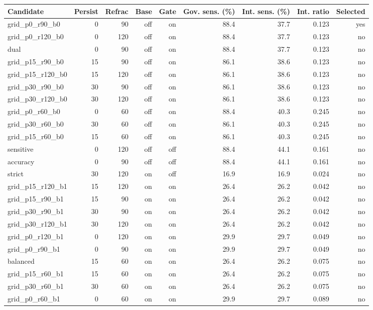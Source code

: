 \begin{tabular}{@{}lrrrrrrrr@{}}
\toprule
Candidate & Persist & Refrac & Base & Gate & Gov. sens. (\%) & Int. sens. (\%) & Int. ratio & Selected \\
\midrule
grid\_p0\_r90\_b0 & 0 & 90 & off & on & 88.4 & 37.7 & 0.123 & yes \\
grid\_p0\_r120\_b0 & 0 & 120 & off & on & 88.4 & 37.7 & 0.123 & no \\
dual & 0 & 90 & off & on & 88.4 & 37.7 & 0.123 & no \\
grid\_p15\_r90\_b0 & 15 & 90 & off & on & 86.1 & 38.6 & 0.123 & no \\
grid\_p15\_r120\_b0 & 15 & 120 & off & on & 86.1 & 38.6 & 0.123 & no \\
grid\_p30\_r90\_b0 & 30 & 90 & off & on & 86.1 & 38.6 & 0.123 & no \\
grid\_p30\_r120\_b0 & 30 & 120 & off & on & 86.1 & 38.6 & 0.123 & no \\
grid\_p0\_r60\_b0 & 0 & 60 & off & on & 88.4 & 40.3 & 0.245 & no \\
grid\_p30\_r60\_b0 & 30 & 60 & off & on & 86.1 & 40.3 & 0.245 & no \\
grid\_p15\_r60\_b0 & 15 & 60 & off & on & 86.1 & 40.3 & 0.245 & no \\
sensitive & 0 & 120 & off & off & 88.4 & 44.1 & 0.161 & no \\
accuracy & 0 & 90 & off & off & 88.4 & 44.1 & 0.161 & no \\
strict & 30 & 120 & on & off & 16.9 & 16.9 & 0.024 & no \\
grid\_p15\_r120\_b1 & 15 & 120 & on & on & 26.4 & 26.2 & 0.042 & no \\
grid\_p15\_r90\_b1 & 15 & 90 & on & on & 26.4 & 26.2 & 0.042 & no \\
grid\_p30\_r90\_b1 & 30 & 90 & on & on & 26.4 & 26.2 & 0.042 & no \\
grid\_p30\_r120\_b1 & 30 & 120 & on & on & 26.4 & 26.2 & 0.042 & no \\
grid\_p0\_r120\_b1 & 0 & 120 & on & on & 29.9 & 29.7 & 0.049 & no \\
grid\_p0\_r90\_b1 & 0 & 90 & on & on & 29.9 & 29.7 & 0.049 & no \\
balanced & 15 & 60 & on & on & 26.4 & 26.2 & 0.075 & no \\
grid\_p15\_r60\_b1 & 15 & 60 & on & on & 26.4 & 26.2 & 0.075 & no \\
grid\_p30\_r60\_b1 & 30 & 60 & on & on & 26.4 & 26.2 & 0.075 & no \\
grid\_p0\_r60\_b1 & 0 & 60 & on & on & 29.9 & 29.7 & 0.089 & no \\
\bottomrule
\end{tabular}
